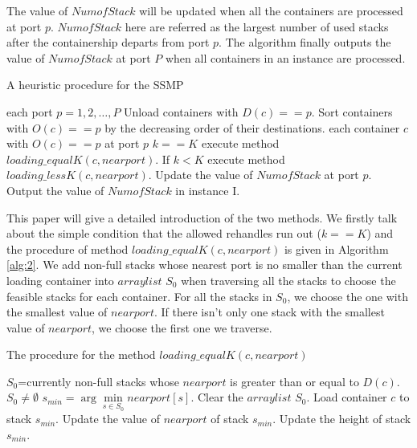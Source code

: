 \documentclass[review,3p,times,authoryear,12pt]{elsarticle}
\begin{document}
The value of $NumofStack$ will be updated when all the containers are processed at port $p$.
$NumofStack$ here are referred as the largest number of used stacks after the containership departs from port $p$.
The algorithm finally outputs the value of $NumofStack$ at port $P$ when all containers in an instance are processed.

\begin{algorithm}[htbp]
  \caption{A heuristic procedure for the SSMP}
  \label{alg:1}
  \begin{codebox}

    \li \For each port $p=1, 2 , \ldots,P $
    \li \Do
                Unload containers with $D(c)==p$.
    \li         Sort containers with $O(c)==p$ by the decreasing order of their destinations.
    \li         \For each container $c$ with $O(c)==p$ at port $p$
    \li         \Do
                   \If $k==K$
    \li            \Then
                        execute method $loading\_equalK(c,nearport)$.
    \li            \Else If $k < K$
    \li                 execute method $loading\_lessK(c,nearport)$.
                   \End
                \End
    \li          Update the value of $NumofStack$ at port $p$.
        \End
    \li Output the value of $NumofStack$ in instance I.

 \end{codebox}
 \end{algorithm}

This paper will give a detailed introduction of the two methods.
We firstly talk about the simple condition that the allowed rehandles run out ($k==K$) and the procedure of method $loading\_equalK(c,nearport)$ is given in Algorithm \ref{alg:2}.
We add non-full stacks whose nearest port is no smaller than the current loading container into $arraylist$ $S_0$ when traversing all the stacks to choose the feasible stacks for each container.
For all the stacks in $S_0$, we choose the one with the smallest value of $nearport$.
If there isn't only one stack with the smallest value of $nearport$, we choose the first one we traverse.

\begin{algorithm}[htbp]
    \caption{The procedure for the method $loading\_equalK(c,nearport)$}
    \label{alg:2}
    \begin{codebox}
        \li $S_0$=currently non-full stacks whose $nearport$ is greater than or equal to $D(c)$.
        \li \If $S_0 \neq \emptyset$
        \li \Then
                 $s_{min}=\arg\min \limits_{s\in S_0} nearport[s]$.
        \li      Clear the $arraylist$ $S_0$.
        \li      Load container $c$ to stack $s_{min}$.
            \End
        \li Update the value of $nearport$ of stack $s_{min}$.
        \li Update the height of stack $s_{min}$.

       \end{codebox}
\end{algorithm}
\end{document}
